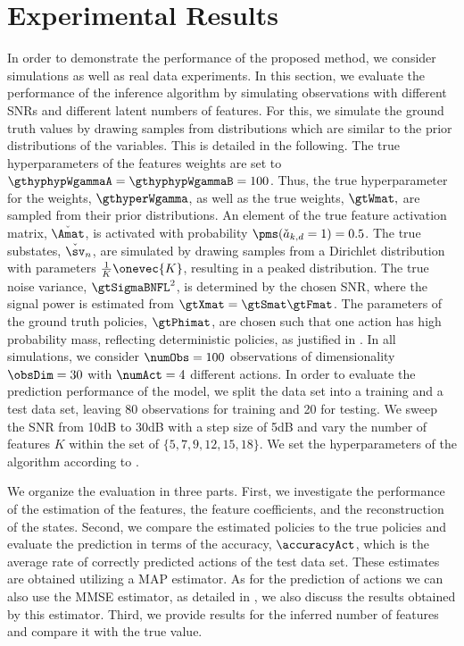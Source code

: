 \documentclass{article}
\begin{document}
\section{Experimental Results}
\label{sec::simulations}
In order to demonstrate the performance of the proposed method, we consider simulations as well as real data experiments. 
In this section, we evaluate the performance of the inference algorithm by simulating observations with different \acp{SNR} and different latent numbers of features. 
For this, we simulate the ground truth values by drawing samples from distributions which are similar to the prior distributions of the variables.
This is detailed in the following.
The true hyperparameters of the features weights are set to $\gthyphypWgammaA = \gthyphypWgammaB = 100$.
Thus, the true hyperparameter for the weights, $ \gthyperWgamma $, as well as the true weights, $ \gtWmat, $ are sampled from their prior distributions.
An element of the true feature activation matrix, $\check{\Amat}$, is activated with probability $\pms(\check{a}_{k,d}=1) =0.5$. 
The true substates, $\check{\sv}_n$, are simulated by drawing samples from a Dirichlet distribution with parameters $\frac{1}{K} \onevec{K}$, resulting in a peaked distribution.
The true noise variance, $\gtSigmaBNFL^2$, is determined by the chosen \ac{SNR}, where the signal power is estimated from $\gtXmat = \gtSmat \gtFmat$.
The parameters of the ground truth policies, $ \gtPhimat $, are chosen such that one action has high probability mass, reflecting deterministic policies, as justified in . 
In all simulations, we consider $\numObs = 100$ observations of dimensionality $\obsDim = 30$ with $\numAct = 4$ different actions.
In order to evaluate the prediction performance of the model, we split the data set into a training and a test data set, leaving 80 observations for training and 20 for testing.
We sweep the \ac{SNR} from \unit{10}{dB} to \unit{30}{dB} with a step size of \unit{5}{dB} and vary the number of features $K$ within the set of $\{5, 7, 9, 12, 15, 18\}$. 
We set the hyperparameters of the algorithm according to .

We organize the evaluation in three parts.
First, we investigate the performance of the estimation of the features, the feature coefficients, and the reconstruction of the states. 
Second, we compare the estimated policies to the true policies and evaluate the prediction in terms of the accuracy, $ \accuracyAct $, which is the average rate of correctly predicted actions of the test data set.
These estimates are obtained utilizing a \ac{MAP} estimator.
As for the prediction of actions we can also use the \ac{MMSE} estimator, as detailed in , we also discuss the results obtained by this estimator. 
Third, we provide results for the inferred number of features and compare it with the true value.
\end{document}
